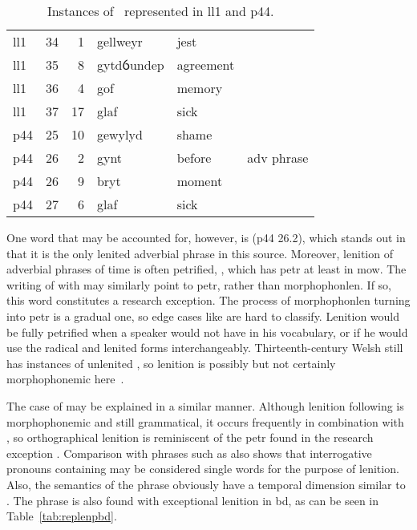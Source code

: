 \begin{table}[h]
  \centering
  \caption{Instances of \lT\ represented in \acrshort{ll1} and \acrshort{p44}.}
  \label{tab:ltrepll1p44}
  \begin{tabular}{lddwql}
    \toprule
     &  &  &  &  &  \\
    \midrule
    \acrshort{ll1} & 34 & 1 & gellweyr & jest &  \\
    \acrshort{ll1} & 35 & 8 & gytdỽundep & agreement &  \\
    \acrshort{ll1} & 36 & 4 & gof & memory &  \\
    \acrshort{ll1} & 37 & 17 & glaf & sick &  \\
    \acrshort{p44} & 25 & 10 & gewylyd & shame &  \\
    \acrshort{p44} & 26 & 2 & gynt & before & adv phrase \\
    \acrshort{p44} & 26 & 9 & bryt & moment &  \\
    \acrshort{p44} & 27 & 6 & glaf & sick &  \\
    \bottomrule
  \end{tabular}%
\end{table}

One word that may be accounted for, however, is  (\gls{p44} 26.2), which stands out in that it is the only lenited adverbial phrase in this source.
Moreover, lenition of adverbial phrases of time is often petrified, \eg {}, which has \gls{petr} at least in \gls{mow}.
The writing of  with  may similarly point to \gls{petr}, rather than \gls{morphophonlen}.
If so, this word constitutes a research exception. The process of \gls{morphophonlen} turning into \gls{petr} is a gradual one, so edge cases like  are hard to classify. Lenition would be fully petrified when a speaker would not have  in his vocabulary, or if he would use the radical and lenited forms interchangeably. Thirteenth-century Welsh still has instances of unlenited , so lenition is possibly but not certainly morphophonemic here~\autocite[s.v.~]{bevan_geiriadur_2014}.

The case of  may be explained in a similar manner.
Although lenition following  is morphophonemic and still grammatical, it occurs frequently in combination with , so orthographical lenition is reminiscent of the \gls{petr} found in the research exception .
Comparison with phrases  such as  also shows that interrogative pronouns containing  may be considered single words for the purpose of lenition.
Also, the semantics of the phrase obviously have a temporal dimension similar to .
The phrase  is also found with exceptional lenition in \gls{bd}, as can be seen in Table~\ref{tab:replenpbd}.

